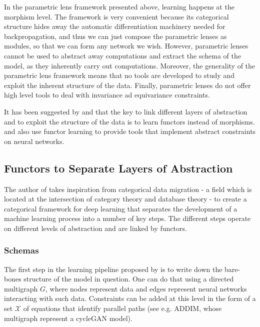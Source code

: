 \documentclass[12pt,a4paper,openright,twoside]{report}
\theoremstyle{plain}
\theoremstyle{definition}
\begin{document}
In the parametric lens framework presented above, learning happens at the morphism level. The framework is very convenient because its categorical structure hides away the automatic differentiation machinery needed for backpropagation, and thus we can just compose the parametric lenses as modules, so that we can form any network we wish. However, parametric lenses cannot be used to abstract away computations and extract the schema of the model, as they inherently carry out computations. Moreover, the generality of the parametric lens framework means that no tools are developed to study and exploit the inherent structure of the data. Finally, parametric lenses do not offer high level tools to deal with invariance ad equivariance constraints. 

It has been suggested by \cite{gavranovic2019compositional} and \cite{sheshmani2021categorical} that the key to link different layers of abstraction and to exploit the structure of the data is to learn functors instead of morphisms. \cite{gavranovic2019compositional} and \cite{vaswani2017attention} also use functor learning to provide tools that implement abstract constraints on neural networks.



\subsection{Functors to Separate Layers of Abstraction}

The author of \cite{gavranovic2019compositional} takes inspiration from categorical data migration - a field which is located at the intersection of category theory and database theory - to create a categorical framework for deep learning that separates the development of a machine learning process into a number of key steps. The different steps operate on different levels of abstraction and are linked by functors.

\subsubsection{Schemas}

The first step in the learning pipeline proposed by \cite{gavranovic2019compositional} is to write down the bare-bones structure of the model in question. One can do that using a directed multigraph $G$, where nodes represent data and edges represent neural networks interacting with such data. Constraints can be added at this level in the form of a set $\mathcal{X}$ of equations that identify parallel paths (see e.g. ADDIM, whose multigraph represent a cycleGAN model).
\end{document}
